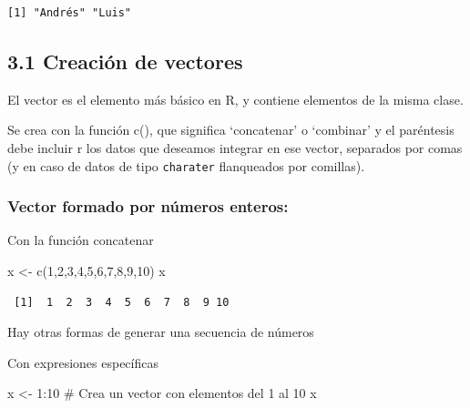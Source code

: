 \documentclass[
  letterpaper,
  DIV=11,
  numbers=noendperiod]{scrreprt}
\newenvironment{Shaded}{\begin{snugshade}}{\end{snugshade}}
\newcommand{\CommentTok}[1]{\textcolor[rgb]{0.37,0.37,0.37}{#1}}
\newcommand{\DecValTok}[1]{\textcolor[rgb]{0.68,0.00,0.00}{#1}}
\newcommand{\FunctionTok}[1]{\textcolor[rgb]{0.28,0.35,0.67}{#1}}
\newcommand{\NormalTok}[1]{\textcolor[rgb]{0.00,0.23,0.31}{#1}}
\newcommand{\OtherTok}[1]{\textcolor[rgb]{0.00,0.23,0.31}{#1}}
\newcommand{\SpecialCharTok}[1]{\textcolor[rgb]{0.37,0.37,0.37}{#1}}
\begin{document}
\begin{verbatim}
[1] "Andrés" "Luis"  
\end{verbatim}

\hypertarget{creaciuxf3n-de-vectores}{%
\subsection{\texorpdfstring{\textbf{3.1 Creación de
vectores}}{3.1 Creación de vectores}}\label{creaciuxf3n-de-vectores}}

El vector es el elemento más básico en R, y contiene elementos de la
misma clase.

Se crea con la función c(), que significa `concatenar' o `combinar' y el
paréntesis debe incluir r los datos que deseamos integrar en ese vector,
separados por comas (y en caso de datos de tipo \texttt{charater}
flanqueados por comillas).

\hypertarget{vector-formado-por-nuxfameros-enteros}{%
\subsubsection{Vector formado por números
enteros:}\label{vector-formado-por-nuxfameros-enteros}}

Con la función concatenar

\begin{Shaded}
\begin{Highlighting}[]
\NormalTok{x }\OtherTok{\textless{}{-}} \FunctionTok{c}\NormalTok{(}\DecValTok{1}\NormalTok{,}\DecValTok{2}\NormalTok{,}\DecValTok{3}\NormalTok{,}\DecValTok{4}\NormalTok{,}\DecValTok{5}\NormalTok{,}\DecValTok{6}\NormalTok{,}\DecValTok{7}\NormalTok{,}\DecValTok{8}\NormalTok{,}\DecValTok{9}\NormalTok{,}\DecValTok{10}\NormalTok{)}
\NormalTok{x}
\end{Highlighting}
\end{Shaded}

\begin{verbatim}
 [1]  1  2  3  4  5  6  7  8  9 10
\end{verbatim}

Hay otras formas de generar una secuencia de números

Con expresiones específicas

\begin{Shaded}
\begin{Highlighting}[]
\NormalTok{x }\OtherTok{\textless{}{-}} \DecValTok{1}\SpecialCharTok{:}\DecValTok{10}
\CommentTok{\# Crea un vector con elementos del 1 al 10}
\NormalTok{x}
\end{Highlighting}
\end{Shaded}
\end{document}
